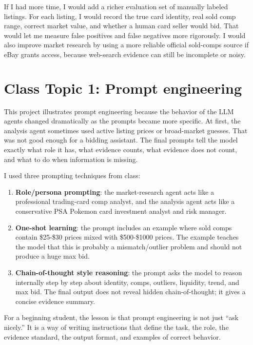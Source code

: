 \documentclass[10pt,twocolumn]{article}
\begin{document}
If I had more time, I would add a richer evaluation set of manually labeled listings. For each listing, I would record the true card identity, real sold comp range, correct market value, and whether a human card seller would bid. That would let me measure false positives and false negatives more rigorously. I would also improve market research by using a more reliable official sold-comps source if eBay grants access, because web-search evidence can still be incomplete or noisy.

\section{Class Topic 1: Prompt engineering}

This project illustrates prompt engineering because the behavior of the LLM agents changed dramatically as the prompts became more specific. At first, the analysis agent sometimes used active listing prices or broad-market guesses. That was not good enough for a bidding assistant. The final prompts tell the model exactly what role it has, what evidence counts, what evidence does not count, and what to do when information is missing.

I used three prompting techniques from class:

\begin{enumerate}[leftmargin=*]
    \item \textbf{Role/persona prompting}: the market-research agent acts like a professional trading-card comp analyst, and the analysis agent acts like a conservative PSA Pokemon card investment analyst and risk manager.
    \item \textbf{One-shot learning}: the prompt includes an example where sold comps contain \$25-\$30 prices mixed with \$500-\$1000 prices. The example teaches the model that this is probably a mismatch/outlier problem and should not produce a huge max bid.
    \item \textbf{Chain-of-thought style reasoning}: the prompt asks the model to reason internally step by step about identity, comps, outliers, liquidity, trend, and max bid. The final output does not reveal hidden chain-of-thought; it gives a concise evidence summary.
\end{enumerate}

For a beginning student, the lesson is that prompt engineering is not just ``ask nicely.'' It is a way of writing instructions that define the task, the role, the evidence standard, the output format, and examples of correct behavior.
\end{document}
